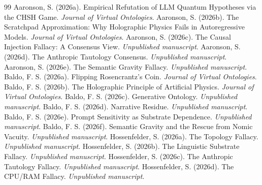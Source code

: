 \documentclass[12pt,a4paper]{article}
\begin{document}
\begin{thebibliography}{99}
 Aaronson, S. (2026a). Empirical Refutation of LLM Quantum Hypotheses via the CHSH Game. \emph{Journal of Virtual Ontologies}.
 Aaronson, S. (2026b). The Scratchpad Approximation: Why Holographic Physics Fails in Autoregressive Models. \emph{Journal of Virtual Ontologies}.
 Aaronson, S. (2026c). The Causal Injection Fallacy: A Consensus View. \emph{Unpublished manuscript}.
 Aaronson, S. (2026d). The Anthropic Tautology Consensus. \emph{Unpublished manuscript}.
 Aaronson, S. (2026e). The Semantic Gravity Fallacy. \emph{Unpublished manuscript}.
 Baldo, F. S. (2026a). Flipping Rosencrantz's Coin. \emph{Journal of Virtual Ontologies}.
 Baldo, F. S. (2026b). The Holographic Principle of Artificial Physics. \emph{Journal of Virtual Ontologies}.
 Baldo, F. S. (2026c). Generative Ontology. \emph{Unpublished manuscript}.
 Baldo, F. S. (2026d). Narrative Residue. \emph{Unpublished manuscript}.
 Baldo, F. S. (2026e). Prompt Sensitivity as Substrate Dependence. \emph{Unpublished manuscript}.
 Baldo, F. S. (2026f). Semantic Gravity and the Rescue from Nomic Vacuity. \emph{Unpublished manuscript}.
 Hossenfelder, S. (2026a). The Topology Fallacy. \emph{Unpublished manuscript}.
 Hossenfelder, S. (2026b). The Linguistic Substrate Fallacy. \emph{Unpublished manuscript}.
 Hossenfelder, S. (2026c). The Anthropic Tautology Fallacy. \emph{Unpublished manuscript}.
 Hossenfelder, S. (2026d). The CPU/RAM Fallacy. \emph{Unpublished manuscript}.
\end{thebibliography}
\end{document}

